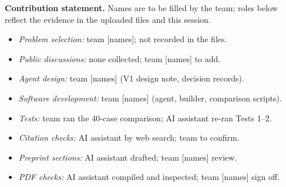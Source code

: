 \documentclass[10pt,twocolumn,letterpaper]{article}
\begin{document}
\textbf{Contribution statement.} Names are to be filled by the team; roles below reflect the evidence in the uploaded files and this session.
\begin{itemize}\itemsep0pt
\item \emph{Problem selection:} team [names]; not recorded in the files.
\item \emph{Public discussions:} none collected; team [names] to add.
\item \emph{Agent design:} team [names] (V1 design note, decision records).
\item \emph{Software development:} team [names] (agent, builder, comparison scripts).
\item \emph{Tests:} team ran the 40-case comparison; AI assistant re-ran Tests 1--2.
\item \emph{Citation checks:} AI assistant by web search; team to confirm.
\item \emph{Preprint sections:} AI assistant drafted; team [names] review.
\item \emph{PDF checks:} AI assistant compiled and inspected; team [names] sign off.
\end{itemize}



\end{document}
